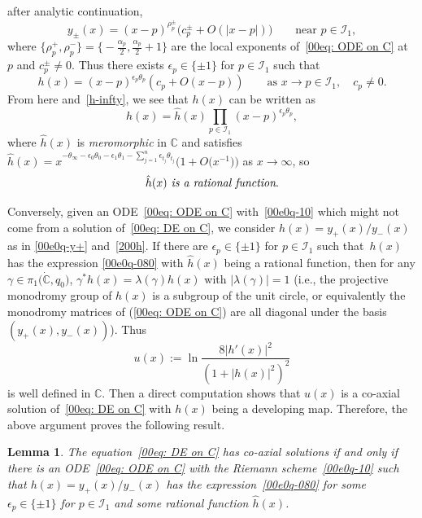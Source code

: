 \documentclass[10pt,a4paper]{amsart}
\numberwithin{equation}{section}
\newtheorem{Lemma}[Theorem]{Lemma}
\begin{document}
 after analytic continuation,
 \[y_{\pm}(x)=(x-p)^{\rho_p^{\pm}}\bigl(c_p^{\pm}+O(|x-p|)\bigr)\qquad \text{near }p\in \mathcal{I}_1,\]
 where
 $\{\rho_p^{+},\rho_p^{-}\}=\bigl\{-\frac{\alpha_p}{2},\frac{\alpha_p}{2}+1\bigr\}$
 are the local exponents of~\eqref{00eq: ODE on C} at $p$ and
 $c_p^{\pm}\neq 0$.
Thus there exists $\epsilon_p\in\{\pm 1\}$ for $p\in \mathcal{I}_1$ such that
\[h(x)=(x-p)^{\epsilon_p\theta_p}(c_p+O(x-p))\qquad \text{as }x\to p\in \mathcal{I}_1,\quad c_p\neq 0.\]
From here and~\eqref{h-infty}, we see that $h(x)$ can be written as
\begin{equation}\label{00e0q-080}
 h(x)=\hat{h}(x)\prod_{p\in \mathcal{I}_1}(x-p)^{\epsilon_{p}\theta_{p}},
\end{equation}
where $\hat{h}(x)$ is \emph{meromorphic} in $\mathbb{C}$ and satisfies $\hat{h}(x)=x^{-\theta_\infty-\epsilon_0\theta_0-\epsilon_1\theta_1-\sum_{j=1}^n\epsilon_{t_j}\theta_{t_j}}\bigl(1+O\bigl(x^{-1}\bigr)\bigr)$ as $x\to\infty$, so
\begin{equation}\label{hhat}\emph{$\hat{h}(x)$ is a rational function}.\end{equation}

Conversely, given an ODE~\eqref{00eq: ODE on C} with~\eqref{00e0q-10}
which might not come from a solution of~\eqref{00eq: DE on C}, we
consider $h(x)=y_{+}(x)/y_{-}(x)$ as in
\eqref{00e0q-y+} and~\eqref{200h}. If there are $\epsilon_p\in\{\pm 1\}$
for $p\in \mathcal{I}_1$ such that~$h(x)$ has the expression
\eqref{00e0q-080} with $\hat h(x)$ being a rational function, then for
any $\gamma\in\pi_1\bigl(\dot{\mathbb{C}},q_0\bigr)$,
$\gamma^*h(x)=\lambda(\gamma)h(x)$ with $|\lambda(\gamma)|=1$
(i.e., the projective monodromy group of $h(x)$ is a subgroup of the
unit circle, or equivalently the monodromy matrices of (\ref{00eq: ODE
 on C}) are all diagonal under the basis $(y_{+}(x),
y_{-}(x))$). Thus
\[u(x):=\ln\frac{8|h'(x)|^2}{(1+|h(x)|^2)^2}\]
is well defined in $\mathbb{C}$. Then a direct computation shows that $u(x)$ is a co-axial solution of~\eqref{00eq: DE on C} with $h(x)$ being a developing map. Therefore, the above argument proves the following result.

\begin{Lemma}\label{lemm3-1}
 The equation~\eqref{00eq: DE on C} has co-axial solutions if and
 only if there is an ODE~\eqref{00eq: ODE on C} with the Riemann
 scheme~\eqref{00e0q-10} such that
 $h(x)=y_{+}(x)/y_{-}(x)$ has the expression~\eqref{00e0q-080} for
 some $\epsilon_p\in\{\pm 1\}$ for $p\in \mathcal{I}_1$ and some
 rational function $\hat{h}(x)$.
\end{Lemma}
\end{document}
